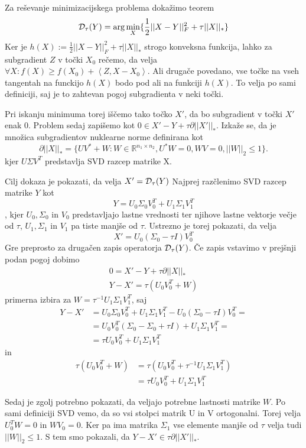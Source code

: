 Za reševanje minimizacijskega problema dokažimo teorem
\[
    \mathcal{D}_\tau(Y) = \arg \min_{X} \{ \frac{1}{2} ||X - Y||^2_F + \tau||X||_* \}
\]
Ker je $h(X) := \frac{1}{2} ||X - Y||^2_F + \tau||X||_*$ strogo konveksna funkcija, lahko za subgradient $Z$ v točki $X_0$ rečemo, da velja $\forall X: f(X) \geq  f(X_0) + \left< Z, X - X_0 \right>$. Ali drugače povedano, vse točke na vseh tangentah na funckijo $h(X)$ bodo pod ali na funkciji $h(X)$. To velja po sami definiciji, saj je to zahtevan pogoj subgradienta v neki točki.

Pri iskanju minimuma torej iščemo tako točko $X'$, da bo subgradient v točki $X'$ enak 0. Problem sedaj zapišemo kot $0 \in X' - Y + \tau \partial||X'||_*$. Izkaže se, da je množica subgradientov nuklearne norme definirana kot
\[
    \partial||X||_* = \{UV^* + W: W \in \mathbb{R}^{n_1 \times n_2}, U^*W = 0, WV = 0, ||W||_2 \leq 1 \}.
\]
kjer $U \Sigma V^T$ predstavlja SVD razcep matrike X. \cite{CCS}

Cilj dokaza je pokazati, da velja $X' = \mathcal{D}_\tau(Y)$ Najprej razčlenimo SVD razcep matrike $Y$ kot 
\[
    Y = U_0\Sigma_0V_0^T + U_1\Sigma_1V_1^T
\],
kjer $U_0, \Sigma_0$ in $V_0$ predstavljajo lastne vrednosti ter njihove lastne vektorje večje od $\tau$, $U_1, \Sigma_1$ in $V_1$ pa tiste manjše od $\tau$. Ustrezno je torej pokazati, da velja 
\[
    X' = U_0(\Sigma_0 - \tau I)V_0^T
\] Gre preprosto za drugačen zapis operatorja $\mathcal{D}_\tau(Y)$.
Če zapis vstavimo v prejšnji podan pogoj dobimo
\begin{align*}
    0 = X' - Y + \tau \partial ||X||_*\\
    Y- X' = \tau (U_0 V_0^T + W)
\end{align*}
primerna izbira za $W = \tau^{-1} U_1 \Sigma_1 V_1^T$, saj
\begin{align*}
    Y-X' &= U_0\Sigma_0V_0^T + U_1\Sigma_1V_1^T - U_0(\Sigma_0 - \tau I)V_0^T =\\ 
    &= U_0V_0^T(\Sigma_0 - \Sigma_0 + \tau I) + U_1\Sigma_1 V_1^T = \\
    &= \tau U_0 V_0^T + U_1\Sigma_1 V_1^T
\end{align*}
in 
\begin{align*}
    \tau(U_0 V_0^T + W) &= \tau(U_0V_0^T + \tau^{-1} U_1 \Sigma_1 V_1^T)\\ 
    &= \tau U_0 V_0^T + U_1 \Sigma_1 V_1^T 
\end{align*}

Sedaj je zgolj potrebno pokazati, da veljajo potrebne lastnosti matrike $W$.
Po sami definiciji SVD vemo, da so vsi stolpci matrik U in V ortogonalni. Torej velja $U_0^TW = 0$ in $WV_0 = 0$. Ker pa ima matrika $\Sigma_1$ vse elemente manjše od $\tau$ velja tudi $||W||_2 \leq 1$. S tem smo pokazali, da $Y - X' \in \tau \partial ||X'||_*$.

